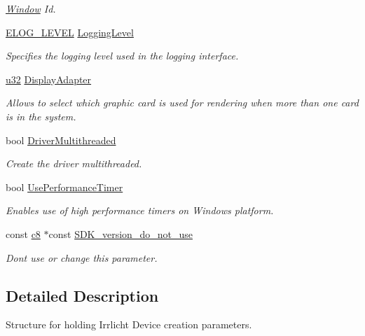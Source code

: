 \begin{DoxyCompactItemize}
\begin{DoxyCompactList}\small\item\em \hyperlink{classWindow}{Window} Id. \end{DoxyCompactList}\item 
\hyperlink{namespaceirr_aa2d1cac68606a25ed24cfffccfa30a92}{E\+L\+O\+G\+\_\+\+L\+E\+V\+EL} \hyperlink{structirr_1_1SIrrlichtCreationParameters_a2aa305ffabdd842084ddef5014b3e411}{Logging\+Level}
\begin{DoxyCompactList}\small\item\em Specifies the logging level used in the logging interface. \end{DoxyCompactList}\item 
\hyperlink{namespaceirr_a0416a53257075833e7002efd0a18e804}{u32} \hyperlink{structirr_1_1SIrrlichtCreationParameters_aa58e8699007135f9d950712f96fab730}{Display\+Adapter}
\begin{DoxyCompactList}\small\item\em Allows to select which graphic card is used for rendering when more than one card is in the system. \end{DoxyCompactList}\item 
bool \hyperlink{structirr_1_1SIrrlichtCreationParameters_a0b05e1ad03575edb74f625180860072d}{Driver\+Multithreaded}
\begin{DoxyCompactList}\small\item\em Create the driver multithreaded. \end{DoxyCompactList}\item 
bool \hyperlink{structirr_1_1SIrrlichtCreationParameters_a5bb2ea5e72eb07a049b1b7c707f405ef}{Use\+Performance\+Timer}
\begin{DoxyCompactList}\small\item\em Enables use of high performance timers on Windows platform. \end{DoxyCompactList}\item 
const \hyperlink{namespaceirr_a9395eaea339bcb546b319e9c96bf7410}{c8} $\ast$const \hyperlink{structirr_1_1SIrrlichtCreationParameters_af1810ed8c5451fabb15722b6971faa3f}{S\+D\+K\+\_\+version\+\_\+do\+\_\+not\+\_\+use}
\begin{DoxyCompactList}\small\item\em Don\textquotesingle{}t use or change this parameter. \end{DoxyCompactList}\end{DoxyCompactItemize}


\subsection{Detailed Description}
Structure for holding Irrlicht Device creation parameters. 

